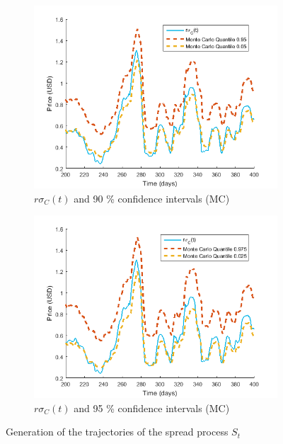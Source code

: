 \documentclass[11pt,a4,twosided,singlespacing,titlepagenumber=on]{scrreprt}
\numberwithin{equation}{chapter} %
\theoremstyle{remark}
\begin{document}
\begin{figure}[H]
\begin{subfigure}[t]{0.49\textwidth}
        \centering
        \includegraphics[width=1\textwidth]{model_vol/4}
        \caption{$r\sigma_C(t)$ and 90 \% confidence intervals (MC)}
        \label{vol_mod_4}
    \end{subfigure}
    \begin{subfigure}[t]{0.49\textwidth}
        \centering
        \includegraphics[width=1\textwidth]{model_vol/4_2}
        \caption{$r\sigma_C(t)$ and 95 \% confidence intervals (MC)}
        \label{vol_mod_4}
    \end{subfigure}
    \caption{Generation of the trajectories of the spread process $S_t$}
    \label{fig:rolling_vol_and_confidence_intervals}
\end{figure}
\end{document}
